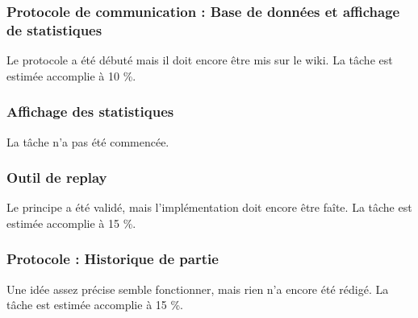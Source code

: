 \documentclass{article}
\begin{document}
\subsubsection*{Protocole de communication : Base de données et affichage de
statistiques}
Le protocole a été débuté mais il doit encore être mis sur le wiki. La tâche
est estimée accomplie à 10 \%.

\subsubsection*{Affichage des statistiques}
La tâche n'a pas été commencée.

\subsubsection*{Outil de replay}
Le principe a été validé, mais l'implémentation doit encore être faîte. La
tâche est estimée accomplie à 15 \%.

\subsubsection*{Protocole : Historique de partie}
Une idée assez précise semble fonctionner, mais rien n'a encore été rédigé.
La tâche est estimée accomplie à 15 \%.
\end{document}
